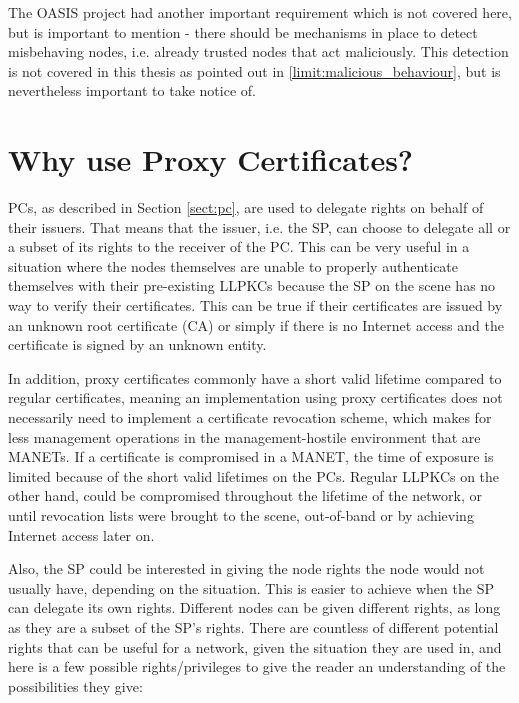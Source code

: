 The OASIS project had another important requirement which is not covered here,
but is important to mention - there should be mechanisms in place to detect
misbehaving nodes, i.e. already trusted nodes that act maliciously. This
detection is not covered in this thesis as pointed out in
\ref{limit:malicious_behaviour}, but is nevertheless important to take notice
of.

\section{Why use Proxy Certificates?}
\acp{PC}, as described in Section \ref{sect:pc}, are used to delegate
rights on behalf of their issuers. That means that the issuer, i.e. the \ac{SP},
can choose to delegate all or a subset of its rights to the receiver of the
\ac{PC}. This can be very useful in a situation where the nodes themselves are
unable to properly authenticate themselves with their pre-existing \acp{LLPKC}
because the \ac{SP} on the scene has no way to verify their certificates. This
can be true if their certificates are issued by an unknown root certificate
(\ac{CA}) or simply if there is no Internet access and the certificate is
signed by an unknown entity.

In addition, proxy certificates commonly have a short valid lifetime compared
to regular certificates, meaning an implementation using proxy certificates does
not necessarily need to implement a certificate revocation scheme, which makes
for less management operations in the management-hostile environment that are
\acp{MANET}. If a certificate is compromised in a \ac{MANET}, the time of
exposure is limited because of the short valid lifetimes on the \acp{PC}.
Regular \acp{LLPKC} on the other hand, could be compromised throughout the
lifetime of the network, or until revocation lists were brought to the scene,
out-of-band or by achieving Internet access later on.

Also, the \ac{SP} could be interested in giving the node rights the node would
not usually have, depending on the situation. This is easier to achieve when the
\ac{SP} can delegate its own rights. Different nodes can be given different
rights, as long as they are a subset of the SP's rights. There are countless of
different potential rights that can be useful for a network, given the
situation they are used in, and here is a few possible rights/privileges to
give the reader an understanding of the possibilities they give:

